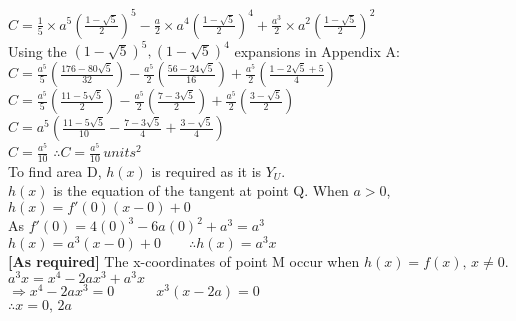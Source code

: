 \documentclass{homework}
\begin{document}
\begin{flushleft}
\begin{paracol}{2}
$C=\frac{1}{5}\times a^5(\frac{1-\sqrt{5}}{2})^5-\frac{a}{2}\times a^4(\frac{1-\sqrt{5}}{2})^4+\frac{a^3}{2}\times a^2(\frac{1-\sqrt{5}}{2})^2$ \vspace{0.5em} \\
Using the $(1-\sqrt{5})^5, (1-\sqrt{5})^4$ expansions in Appendix A: \vspace{0.5em} \\
$C=\frac{a^5}{5} (\frac{176 - 80\sqrt{5}}{32})-\frac{a^5}{2}(\frac{56 - 24 \sqrt{5}}{16})+\frac{a^5}{2}(\frac{1 - 2\sqrt{5}+5}{4})$ \vspace{0.5em} \\
$C=\frac{a^5}{5} (\frac{11 - 5\sqrt{5}}{2})-\frac{a^5}{2}(\frac{7 - 3 \sqrt{5}}{2})+\frac{a^5}{2}(\frac{3 - \sqrt{5}}{2})$ \vspace{0.5em} \\
$C=a^5(\frac{11 - 5\sqrt{5}}{10}-\frac{7 - 3 \sqrt{5}}{4}+\frac{3 - \sqrt{5}}{4})$ \vspace{0.5em} \\
$C=\frac{a^5}{10}$ \hspace{3em} 
$\therefore C=\frac{a^5}{10} \, units^2$ 
\vspace{1.7em} \\
To find area D, $h(x)$ is required as it is $Y_U$. \vspace{0.5em}\\
$h(x)$ is the equation of the tangent at point Q. When $a>0$, $h(x)=f'(0)(x-0)+0$ \vspace{0.5em}\\
As $f'(0)=4(0)^3-6a(0)^2+a^3=a^3$ \vspace{0.5em}\\
$h(x)=a^3(x-0)+0 \hspace{2em} \therefore h(x)=a^3x$ \vspace{0.5em}\\
\hspace{13em} \textbf{[As required]} \vspace{1em}
\switchcolumn
The x-coordinates of point M occur when $h(x)=f(x), \, x\neq 0.$ \vspace{0.5em}\\
$a^3x=x^4-2ax^3+a^3x$ \vspace{0.5em} \\
$\Rightarrow x^4-2ax^3=0 \hspace{3em} x^3(x-2a)=0$\vspace{0.5em}\\
$\therefore x=0,\, 2a$ \vspace{1.2em}\\

\end{paracol}
\end{flushleft}
\end{document}

